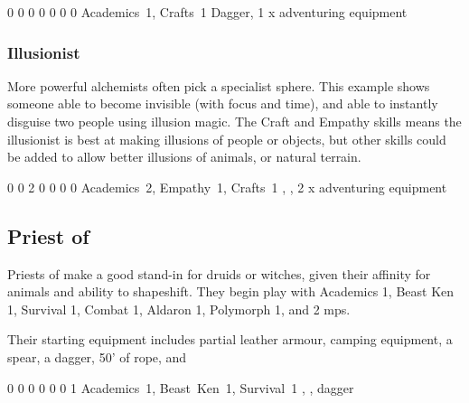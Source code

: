 {\begin{multicols}{2}

{0}%
{0}%
{{0}%
{0}%
{0}}%
{0}%
{0}%
{Academics~1, Crafts~1}%
{Dagger, 1 x adventuring equipment}%
{}

\subsubsection{Illusionist}

More powerful alchemists often pick a specialist sphere.
This example shows someone able to become invisible (with focus and time), and able to instantly disguise two people using illusion magic.
The Craft and Empathy skills means the illusionist is best at making illusions of people or objects, but other skills could be added to allow better illusions of animals, or natural terrain.


{0}%
{0}%
{{2}%
{0}%
{0}}%
{0}%
{0}%
{Academics~2, Empathy~1, Crafts~1}%
{\Dagger, \completeleather, 2 x adventuring equipment}%
{}

\subsection{Priest of }

Priests of  make a good stand-in for druids or witches, given their affinity for animals and ability to shapeshift.
They begin play with Academics 1, Beast Ken 1, Survival 1, Combat 1, Aldaron 1, Polymorph 1, and 2 \glspl{mp}.

Their starting equipment includes partial leather armour, camping equipment, a spear, a dagger, 50' of rope, and 


{0}%
{0}%
{{0}%
{0}%
{0}}%
{0}%
{1}%
{Academics~1, Beast~Ken~1, Survival~1}%
{\spear, \partialleather, dagger}%
{}


\end{multicols}}
